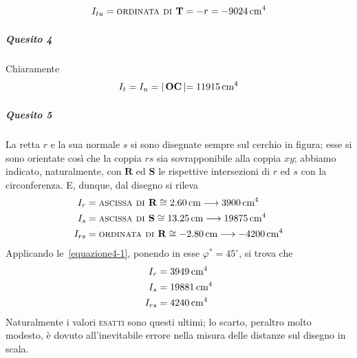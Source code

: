 \begin{equation*}
I_{tu} = \textup{\textsc{ordinata di }}\mathbf{T} = -r = -9024\,\textup{cm}^{4}
\end{equation*}
\noindent \subparagraph{Quesito 4} Chiaramente 
\begin{equation*}
I_t = I_u = \lvert\, \mathbf{O}\mathbf{C}\,\lvert = 11915\,\textup{cm}^{4}
\end{equation*}
\noindent \subparagraph{Quesito 5} La retta $r$ e la sua normale $s$ si sono disegnate sempre sul cerchio in figura; esse si sono orientate così che la coppia $rs$ sia sovrapponibile alla coppia $xy$; abbiamo indicato, naturalmente, con $\mathbf{R}$ ed $\mathbf{S}$ le rispettive intersezioni di $r$ ed $s$ con la circonferenza. E, dunque, dal disegno si rileva
\begin{align*}
I_r &= \textup{\textsc{ascissa di }} \mathbf{R} \cong 2.60\,\textup{cm} \longrightarrow 3900\,\textup{cm}^{4} \\
I_s &= \textup{\textsc{ascissa di }} \mathbf{S} \cong 13.25\,\textup{cm} \longrightarrow 19875\,\textup{cm}^{4} \\
I_{rs} &= \textup{\textsc{ordinata di }}\mathbf{R} \cong -2.80\,\textup{cm} \longrightarrow -4200\,\textup{cm}^{4}
\end{align*}
Applicando le~\eqref{equazione4-1}, ponendo in esse $\varphi^{*}=45^{\circ}$, si trova che
\begin{align*}
I_r &= 3949\,\textup{cm}^{4} \\
I_s &= 19881\,\textup{cm}^{4} \\
I_{rs} &= 4240\,\textup{cm}^{4} 
\end{align*}
Naturalmente i valori \textsc{esatti} sono questi ultimi; lo scarto, peraltro molto modesto, è dovuto all'inevitabile errore nella misura delle distanze sul disegno in scala.
